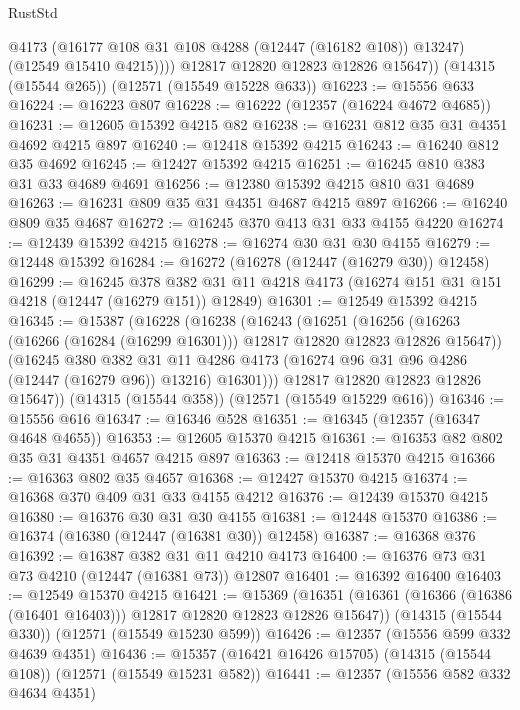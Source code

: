 \begin{lexlean}{RustStd}
\begin{coremodule}
              @4173
              (@16177 @108 @31 @108 @4288 (@12447 (@16182 @108)) @13247)
              (@12549 @15410 @4215))))
        @12817
        @12820
        @12823
        @12826
        @15647))
    (@14315 (@15544 @265))
    (@12571 (@15549 @15228 @633))
@16223 := @15556 @633
@16224 := @16223 @807
@16228 := @16222 (@12357 (@16224 @4672 @4685))
@16231 := @12605 @15392 @4215 @82
@16238 := @16231 @812 @35 @31 @4351 @4692 @4215 @897
@16240 := @12418 @15392 @4215
@16243 := @16240 @812 @35 @4692
@16245 := @12427 @15392 @4215
@16251 := @16245 @810 @383 @31 @33 @4689 @4691
@16256 := @12380 @15392 @4215 @810 @31 @4689
@16263 := @16231 @809 @35 @31 @4351 @4687 @4215 @897
@16266 := @16240 @809 @35 @4687
@16272 := @16245 @370 @413 @31 @33 @4155 @4220
@16274 := @12439 @15392 @4215
@16278 := @16274 @30 @31 @30 @4155
@16279 := @12448 @15392
@16284 := @16272 (@16278 (@12447 (@16279 @30)) @12458)
@16299 := @16245
    @378
    @382
    @31
    @11
    @4218
    @4173
    (@16274 @151 @31 @151 @4218 (@12447 (@16279 @151)) @12849)
@16301 := @12549 @15392 @4215
@16345 := @15387
    (@16228
      (@16238
        (@16243
          (@16251
            (@16256 (@16263 (@16266 (@16284 (@16299 @16301))) @12817 @12820 @12823 @12826 @15647))
            (@16245
              @380
              @382
              @31
              @11
              @4286
              @4173
              (@16274 @96 @31 @96 @4286 (@12447 (@16279 @96)) @13216)
              @16301)))
        @12817
        @12820
        @12823
        @12826
        @15647))
    (@14315 (@15544 @358))
    (@12571 (@15549 @15229 @616))
@16346 := @15556 @616
@16347 := @16346 @528
@16351 := @16345 (@12357 (@16347 @4648 @4655))
@16353 := @12605 @15370 @4215
@16361 := @16353 @82 @802 @35 @31 @4351 @4657 @4215 @897
@16363 := @12418 @15370 @4215
@16366 := @16363 @802 @35 @4657
@16368 := @12427 @15370 @4215
@16374 := @16368 @370 @409 @31 @33 @4155 @4212
@16376 := @12439 @15370 @4215
@16380 := @16376 @30 @31 @30 @4155
@16381 := @12448 @15370
@16386 := @16374 (@16380 (@12447 (@16381 @30)) @12458)
@16387 := @16368 @376
@16392 := @16387 @382 @31 @11 @4210 @4173
@16400 := @16376 @73 @31 @73 @4210 (@12447 (@16381 @73)) @12807
@16401 := @16392 @16400
@16403 := @12549 @15370 @4215
@16421 := @15369
    (@16351 (@16361 (@16366 (@16386 (@16401 @16403))) @12817 @12820 @12823 @12826 @15647))
    (@14315 (@15544 @330))
    (@12571 (@15549 @15230 @599))
@16426 := @12357 (@15556 @599 @332 @4639 @4351)
@16436 := @15357 (@16421 @16426 @15705) (@14315 (@15544 @108)) (@12571 (@15549 @15231 @582))
@16441 := @12357 (@15556 @582 @332 @4634 @4351)

\end{coremodule}
\end{lexlean}
